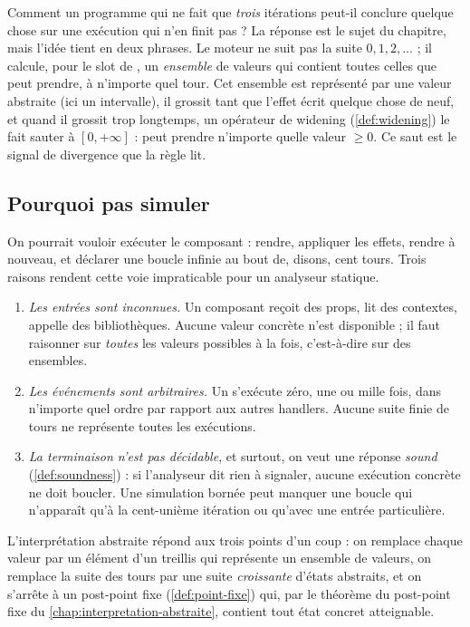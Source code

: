 Comment un programme qui ne fait que \emph{trois} itérations peut-il conclure
quelque chose sur une exécution qui n'en finit pas ? La réponse est le sujet du
chapitre, mais l'idée tient en deux phrases. Le moteur ne suit pas la suite
$0, 1, 2, \dots$ ; il calcule, pour le slot de , un \emph{ensemble}
de valeurs qui contient toutes celles que  peut prendre, à n'importe
quel tour. Cet ensemble est représenté par une valeur abstraite (ici un
intervalle), il grossit tant que l'effet écrit quelque chose de neuf, et
quand il grossit trop longtemps, un opérateur de widening
(\cref{def:widening}) le fait sauter à $[0, +\infty]$ : \og {} peut
prendre n'importe quelle valeur $\geq 0$\fg{}. Ce saut est le signal de
divergence que la règle  lit.

\subsection{Pourquoi pas simuler}

On pourrait vouloir exécuter le composant : rendre, appliquer les effets,
rendre à nouveau, et déclarer une boucle infinie au bout de, disons, cent
tours. Trois raisons rendent cette voie impraticable pour un analyseur
statique.

\begin{enumerate}
  \item \emph{Les entrées sont inconnues.} Un composant reçoit des props, lit
    des contextes, appelle des bibliothèques. Aucune valeur concrète n'est
    disponible ; il faut raisonner sur \emph{toutes} les valeurs possibles à la
    fois, c'est-à-dire sur des ensembles.
  \item \emph{Les événements sont arbitraires.} Un  s'exécute
    zéro, une ou mille fois, dans n'importe quel ordre par rapport aux autres
    handlers. Aucune suite finie de tours ne représente toutes les
    exécutions.
  \item \emph{La terminaison n'est pas décidable}, et surtout, on veut une
    réponse \emph{sound} (\cref{def:soundness}) : si l'analyseur dit
    \og rien à signaler\fg, aucune exécution concrète ne doit boucler. Une
    simulation bornée peut manquer une boucle qui n'apparaît qu'à la
    cent-unième itération ou qu'avec une entrée particulière.
\end{enumerate}

L'interprétation abstraite répond aux trois points d'un coup : on remplace
chaque valeur par un élément d'un treillis qui représente un ensemble de
valeurs, on remplace la suite des tours par une suite \emph{croissante}
d'états abstraits, et on s'arrête à un post-point fixe (\cref{def:point-fixe})
qui, par le théorème du post-point fixe du
\cref{chap:interpretation-abstraite}, contient tout état concret atteignable.

